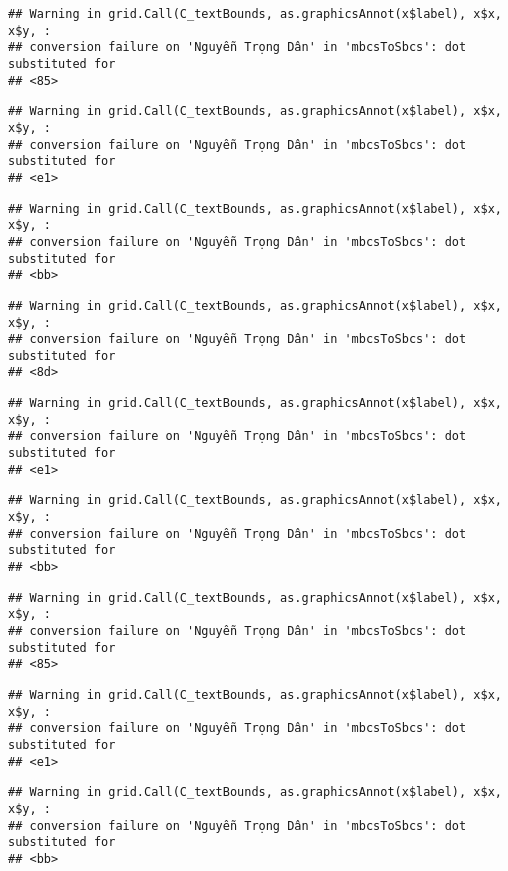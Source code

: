 \documentclass[
]{article}
\begin{document}
\begin{verbatim}
## Warning in grid.Call(C_textBounds, as.graphicsAnnot(x$label), x$x, x$y, :
## conversion failure on 'Nguyễn Trọng Dân' in 'mbcsToSbcs': dot substituted for
## <85>
\end{verbatim}

\begin{verbatim}
## Warning in grid.Call(C_textBounds, as.graphicsAnnot(x$label), x$x, x$y, :
## conversion failure on 'Nguyễn Trọng Dân' in 'mbcsToSbcs': dot substituted for
## <e1>
\end{verbatim}

\begin{verbatim}
## Warning in grid.Call(C_textBounds, as.graphicsAnnot(x$label), x$x, x$y, :
## conversion failure on 'Nguyễn Trọng Dân' in 'mbcsToSbcs': dot substituted for
## <bb>
\end{verbatim}

\begin{verbatim}
## Warning in grid.Call(C_textBounds, as.graphicsAnnot(x$label), x$x, x$y, :
## conversion failure on 'Nguyễn Trọng Dân' in 'mbcsToSbcs': dot substituted for
## <8d>
\end{verbatim}

\begin{verbatim}
## Warning in grid.Call(C_textBounds, as.graphicsAnnot(x$label), x$x, x$y, :
## conversion failure on 'Nguyễn Trọng Dân' in 'mbcsToSbcs': dot substituted for
## <e1>
\end{verbatim}

\begin{verbatim}
## Warning in grid.Call(C_textBounds, as.graphicsAnnot(x$label), x$x, x$y, :
## conversion failure on 'Nguyễn Trọng Dân' in 'mbcsToSbcs': dot substituted for
## <bb>
\end{verbatim}

\begin{verbatim}
## Warning in grid.Call(C_textBounds, as.graphicsAnnot(x$label), x$x, x$y, :
## conversion failure on 'Nguyễn Trọng Dân' in 'mbcsToSbcs': dot substituted for
## <85>
\end{verbatim}

\begin{verbatim}
## Warning in grid.Call(C_textBounds, as.graphicsAnnot(x$label), x$x, x$y, :
## conversion failure on 'Nguyễn Trọng Dân' in 'mbcsToSbcs': dot substituted for
## <e1>
\end{verbatim}

\begin{verbatim}
## Warning in grid.Call(C_textBounds, as.graphicsAnnot(x$label), x$x, x$y, :
## conversion failure on 'Nguyễn Trọng Dân' in 'mbcsToSbcs': dot substituted for
## <bb>
\end{verbatim}
\end{document}
